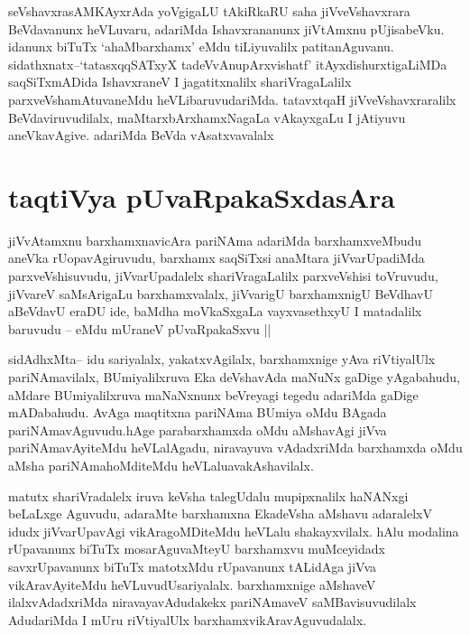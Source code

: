 \begin{artha}
seVshavxrasAMKAyxrAda yoVgigaLU tAkiRkaRU saha jiVveVshavxrara
BeVdavanunx heVLuvaru, adariMda Ishavxrananunx jiVtAmxnu
pUjisabeVku. idanunx biTuTx `ahaMbarxhamx' eMdu tiLiyuvalilx
patitanAguvanu. sidathxnatx--`tatasxqqSATxyX tadeVvAnupArxvishatf'
itAyxdishurxtigaLiMDa saqSiTxmADida IshavxraneV I jagatitxnalilx
shariVragaLalilx parxveVshamAtuvaneMdu heVLibaruvudariMda. tatavxtqaH
jiVveVshavxraralilx BeVdaviruvudilalx, maMtarxbArxhamxNagaLa
vAkayxgaLu I jAtiyuvu aneVkavAgive. adariMda BeVda vAsatxvavalalx 
\end{artha}


\section*{taqtiVya pUvaRpakaSxdasAra}


\begin{artha}
jiVvAtamxnu barxhamxnavicAra pariNAma adariMda barxhamxveMbudu aneVka
rUopavAgiruvudu, barxhamx saqSiTxsi anaMtara jiVvarUpadiMda
parxveVshisuvudu, jiVvarUpadalelx shariVragaLalilx parxveVshisi
toVruvudu, jiVvareV  saMsArigaLu barxhamxvalalx, jiVvarigU
barxhamxnigU BeVdhavU aBeVdavU eraDU ide, baMdha moVkaSxgaLa
vayxvasethxyU I matadalilx baruvudu -- eMdu mUraneV pUvaRpakaSxvu ||
\end{artha}


\begin{artha}
sidAdhxMta-- idu sariyalalx, yakatxvAgilalx, barxhamxnige yAva
riVtiyalUlx pariNAmavilalx, BUmiyalilxruva Eka deVshavAda maNuNx
gaDige yAgabahudu, aMdare BUmiyalilxruva maNaNxnunx beVreyagi tegedu
adariMda gaDige mADabahudu. AvAga maqtitxna pariNAma BUmiya oMdu
BAgada pariNAmavAguvudu.hAge parabarxhamxda oMdu aMshavAgi jiVva
pariNAmavAyiteMdu heVLalAgadu, niravayuva vAdadxriMda barxhamxda oMdu
aMsha pariNAmahoMditeMdu heVLaluavakAshavilalx.
\end{artha}

\begin{artha}
matutx shariVradalelx iruva keVsha talegUdalu mupipxnalilx haNANxgi
beLaLxge Aguvudu, adaraMte  barxhamxna EkadeVsha aMshavu adaralelxV
idudx jiVvarUpavAgi vikAragoMDiteMdu heVLalu shakayxvilalx. hAlu
modalina rUpavanunx biTuTx mosarAguvaMteyU barxhamxvu muMceyidadx
savxrUpavanunx biTuTx matotxMdu rUpavanunx tALidAga jiVva
vikAravAyiteMdu heVLuvudUsariyalalx. barxhamxnige aMshaveV
ilalxvAdadxriMda niravayavAdudakekx pariNAmaveV saMBavisuvudilalx
AdudariMda I mUru riVtiyalUlx barxhamxvikAravAguvudalalx.
\end{artha}


